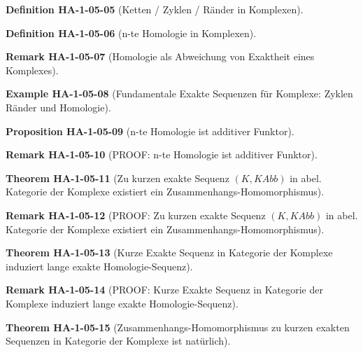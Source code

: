 \documentclass[10pt, letterpaper]{article}
\newcommand{\CustomHeading}[3]{%
  \par\medskip\noindent%
  \textbf{#1 #2} \textnormal{(#3)}.\enskip%
}
\newenvironment{DEF}[2]{\CustomHeading{Definition}{#1}{#2}}{}
\newenvironment{PROP}[2]{\CustomHeading{Proposition}{#1}{#2}}{}
\newenvironment{THEO}[2]{\CustomHeading{Theorem}{#1}{#2}}{}
\newenvironment{REM}[2]{\CustomHeading{Remark}{#1}{#2}}{}
\newenvironment{EXA}[2]{\CustomHeading{Example}{#1}{#2}}{}
\begin{document}
\begin{DEF}{HA-1-05-05}{Ketten / Zyklen / Ränder in Komplexen}
\end{DEF}

\begin{DEF}{HA-1-05-06}{n-te Homologie in Komplexen}
\end{DEF}

\begin{REM}{HA-1-05-07}{Homologie als Abweichung von Exaktheit eines Komplexes}
\end{REM}

\begin{EXA}{HA-1-05-08}{Fundamentale Exakte Sequenzen für Komplexe: Zyklen Ränder und Homologie}
\end{EXA}

\begin{PROP}{HA-1-05-09}{n-te Homologie ist additiver Funktor}
\end{PROP}

\begin{REM}{HA-1-05-10}{PROOF: n-te Homologie ist additiver Funktor}
\end{REM}

\begin{THEO}{HA-1-05-11}{Zu kurzen exakte Sequenz $(K,KAbb)$ in abel. Kategorie der Komplexe existiert ein Zusammenhangs-Homomorphismus}
\end{THEO}

\begin{REM}{HA-1-05-12}{PROOF: Zu kurzen exakte Sequenz $(K,KAbb)$ in abel. Kategorie der Komplexe existiert ein Zusammenhangs-Homomorphismus}
\end{REM}

\begin{THEO}{HA-1-05-13}{Kurze Exakte Sequenz in Kategorie der Komplexe induziert lange exakte Homologie-Sequenz}
\end{THEO}

\begin{REM}{HA-1-05-14}{PROOF: Kurze Exakte Sequenz in Kategorie der Komplexe induziert lange exakte Homologie-Sequenz}
\end{REM}

\begin{THEO}{HA-1-05-15}{Zusammenhangs-Homomorphismus zu kurzen exakten Sequenzen in Kategorie der Komplexe ist natürlich}
\end{THEO}
\end{document}
